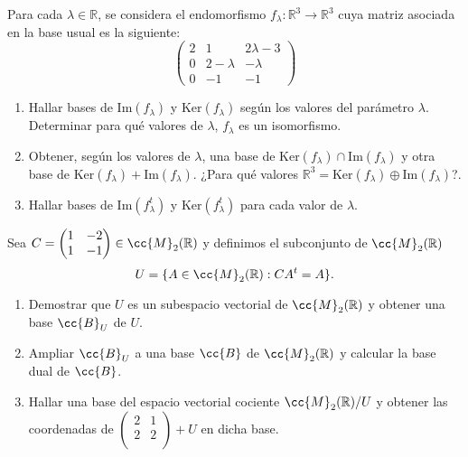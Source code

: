 \documentclass[12pt]{article}
\begin{document}
        \begin{ejercicio}
        [3 puntos] Para cada $\lambda \in \mathbb{R}$, se considera el endomorfismo $f_{\lambda} : \mathbb{R}^3 \to \mathbb{R}^3$ cuya matriz asociada en la base usual es la siguiente:
        \[
        \begin{pmatrix}
        2 & 1 & 2\lambda - 3 \\
        0 & 2 - \lambda & -\lambda \\
        0 & -1 & -1
        \end{pmatrix}
        \]
        \begin{enumerate}
            \item Hallar bases de $\text{Im}(f_{\lambda})$ y $\text{Ker}(f_{\lambda})$ según los valores del parámetro $\lambda$. Determinar para qué valores de $\lambda$, $f_{\lambda}$ es un isomorfismo.
            \item Obtener, según los valores de $\lambda$, una base de $\text{Ker}(f_{\lambda}) \cap \text{Im}(f_{\lambda})$ y otra base de $\text{Ker}(f_{\lambda}) + \text{Im}(f_{\lambda})$. ¿Para qué valores $\mathbb{R}^3 = \text{Ker}(f_{\lambda}) \oplus \text{Im}(f_{\lambda})$?.
            \item Hallar bases de $\text{Im}(f_{\lambda}^t)$ y $\text{Ker}(f_{\lambda}^t)$ para cada valor de $\lambda$.
        \end{enumerate}
        \end{ejercicio}
        
        \begin{ejercicio}
        [3 puntos] Sea $C = \begin{pmatrix}
        1 & -2 \\
        1 & -1 \\
        \end{pmatrix} \in \cc{M}_{2}(\mathbb{R})$ y definimos el subconjunto de $\cc{M}_{2}(\mathbb{R})$
        \[
        U = \{A \in \cc{M}_{2}(\mathbb{R}) : CA^t = A\}.
        \]
        \begin{enumerate}
            \item Demostrar que $U$ es un subespacio vectorial de $\cc{M}_{2}(\mathbb{R})$ y obtener una base $\cc{B}_U$ de $U$.
            \item Ampliar $\cc{B}_U$ a una base $\cc{B}$ de $\cc{M}_{2}(\mathbb{R})$ y calcular la base dual de $\cc{B}$.
            \item Hallar una base del espacio vectorial cociente $\cc{M}_{2}(\mathbb{R})/U$ y obtener las coordenadas de $\begin{pmatrix}
        2 & 1 \\
        2 & 2 \\
        \end{pmatrix} + U$ en dicha base.
        \end{enumerate}
        \end{ejercicio}
        
\end{document}
